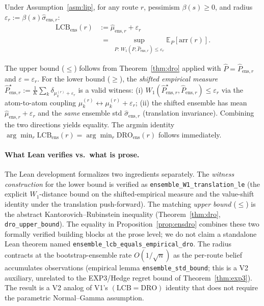 \documentclass[opre,dblanonrev]{informs4}
\renewenvironment{proof}{\Trivlist\item[\hspace*{1em}\hskip\labelsep{\itshape Proof.\enskip}]\ignorespaces}{\endTrivlist\addvspace{0pt}}
\begin{document}
\begin{proposition}[Ensemble LCB $=$ Empirical DRO]\label{prop:ensdro}
Under Assumption~\ref{asm:lip}, for any route $r$, pessimism $\beta(s)\geq 0$,
and radius $\varepsilon_r := \beta(s)\hat\sigma_{\mathrm{ens},r}$:
\begin{align*}
\mathrm{LCB}_{\mathrm{ens}}(r)
&:= \hat\mu_{\mathrm{ens},r} + \varepsilon_r \\
&\;=\;
\sup_{P:\,W_1(P,\hat{P}_{\mathrm{ens},r})\leq\varepsilon_r}\!\!
\mathbb{E}_P[\mathrm{arr}(r)].
\end{align*}
\end{proposition}

\begin{proof}[Proof sketch]
The upper bound ($\leq$) follows from Theorem~\ref{thm:dro} applied with
$\hat{P} = \hat{P}_{\mathrm{ens},r}$ and $\varepsilon = \varepsilon_r$.
For the lower bound ($\geq$), the \emph{shifted empirical measure}
$\hat{P}^{\star}_{\mathrm{ens},r} := \tfrac{1}{K}\sum_k \delta_{\mu^{(r)}_k + \varepsilon_r}$
is a valid witness:
(i) $W_1(\hat{P}^{\star}_{\mathrm{ens},r}, \hat{P}_{\mathrm{ens},r}) \leq \varepsilon_r$
via the atom-to-atom coupling $\mu^{(r)}_k \leftrightarrow \mu^{(r)}_k + \varepsilon_r$;
(ii) the shifted ensemble has mean $\hat\mu_{\mathrm{ens},r} + \varepsilon_r$
and the \emph{same} ensemble std $\hat\sigma_{\mathrm{ens},r}$ (translation
invariance). Combining the two directions yields equality. The argmin
identity
$\arg\min_r \mathrm{LCB}_{\mathrm{ens}}(r) = \arg\min_r \mathrm{DRO}_{\mathrm{ens}}(r)$
follows immediately.
\end{proof}

\paragraph{What Lean verifies vs.\ what is prose.} The Lean development
formalizes two ingredients separately. The \emph{witness
construction} for the lower bound is verified as
\texttt{ensemble\_W1\_\allowbreak translation\_le} (the explicit
$W_1$-distance bound on the shifted-empirical measure and the
value-shift identity under the translation push-forward). The
matching \emph{upper bound} ($\leq$) is the abstract
Kantorovich--Rubinstein inequality
(Theorem~\ref{thm:dro}, \texttt{dro\_upper\_bound}). The
equality in Proposition~\ref{prop:ensdro} combines these two
formally verified building blocks at the prose level; we do not
claim a standalone Lean theorem named
\texttt{ensemble\_\allowbreak lcb\_\allowbreak equals\_\allowbreak empirical\_\allowbreak dro}.
The radius contracts at the bootstrap-ensemble rate
$O(1/\sqrt n)$ as the per-route belief accumulates observations
(empirical lemma \texttt{ensemble\_\allowbreak std\_\allowbreak bound};
this is a V2 auxiliary, unrelated to the EXP3/Hedge regret bound
of Theorem~\ref{thm:exp3}). The result is a V2 analog of V1's
$(\mathrm{LCB}=\mathrm{DRO})$ identity that does not require the
parametric Normal--Gamma assumption.
\end{document}
